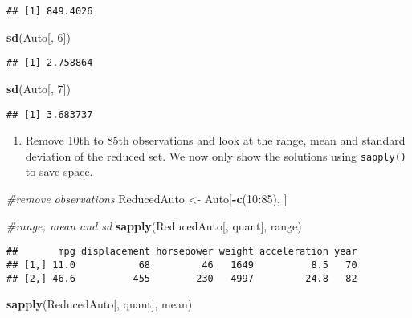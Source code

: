 \documentclass[
]{article}
\newenvironment{Shaded}{\begin{snugshade}}{\end{snugshade}}
\newcommand{\CommentTok}[1]{\textcolor[rgb]{0.56,0.35,0.01}{\textit{#1}}}
\newcommand{\DecValTok}[1]{\textcolor[rgb]{0.00,0.00,0.81}{#1}}
\newcommand{\FunctionTok}[1]{\textcolor[rgb]{0.13,0.29,0.53}{\textbf{#1}}}
\newcommand{\NormalTok}[1]{#1}
\newcommand{\OtherTok}[1]{\textcolor[rgb]{0.56,0.35,0.01}{#1}}
\newcommand{\SpecialCharTok}[1]{\textcolor[rgb]{0.81,0.36,0.00}{\textbf{#1}}}
\providecommand{\tightlist}{%
  \setlength{\itemsep}{0pt}\setlength{\parskip}{0pt}}
\begin{document}
\begin{verbatim}
## [1] 849.4026
\end{verbatim}

\begin{Shaded}
\begin{Highlighting}[]
\FunctionTok{sd}\NormalTok{(Auto[, }\DecValTok{6}\NormalTok{])}
\end{Highlighting}
\end{Shaded}

\begin{verbatim}
## [1] 2.758864
\end{verbatim}

\begin{Shaded}
\begin{Highlighting}[]
\FunctionTok{sd}\NormalTok{(Auto[, }\DecValTok{7}\NormalTok{])}
\end{Highlighting}
\end{Shaded}

\begin{verbatim}
## [1] 3.683737
\end{verbatim}

\begin{enumerate}
\def\labelenumi{\alph{enumi})}
\setcounter{enumi}{3}
\tightlist
\item
  Remove 10th to 85th observations and look at the range, mean and
  standard deviation of the reduced set. We now only show the solutions
  using \texttt{sapply()} to save space.
\end{enumerate}

\begin{Shaded}
\begin{Highlighting}[]
\CommentTok{\#remove observations}
\NormalTok{ReducedAuto }\OtherTok{\textless{}{-}}\NormalTok{ Auto[}\SpecialCharTok{{-}}\FunctionTok{c}\NormalTok{(}\DecValTok{10}\SpecialCharTok{:}\DecValTok{85}\NormalTok{), ]}

\CommentTok{\#range, mean and sd}
\FunctionTok{sapply}\NormalTok{(ReducedAuto[, quant], range)}
\end{Highlighting}
\end{Shaded}

\begin{verbatim}
##       mpg displacement horsepower weight acceleration year
## [1,] 11.0           68         46   1649          8.5   70
## [2,] 46.6          455        230   4997         24.8   82
\end{verbatim}

\begin{Shaded}
\begin{Highlighting}[]
\FunctionTok{sapply}\NormalTok{(ReducedAuto[, quant], mean)}
\end{Highlighting}
\end{Shaded}
\end{document}
